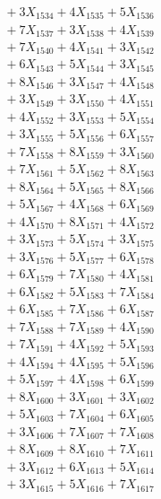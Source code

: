 \documentclass[a4paper,10pt]{article}
\begin{document}
{\begin{align}
&\;  + 3 X_{1534} + 4 X_{1535} + 5 X_{1536} \\[0.3ex]
&\;  + 7 X_{1537} + 3 X_{1538} + 4 X_{1539} \\[0.5ex]\allowbreak
&\;  + 7 X_{1540} + 4 X_{1541} + 3 X_{1542} \\[0.3ex]
&\;  + 6 X_{1543} + 5 X_{1544} + 3 X_{1545} \\[0.3ex]
&\;  + 8 X_{1546} + 3 X_{1547} + 4 X_{1548} \\[0.3ex]
&\;  + 3 X_{1549} + 3 X_{1550} + 4 X_{1551} \\[0.3ex]
&\;  + 4 X_{1552} + 3 X_{1553} + 5 X_{1554} \\[0.3ex]
&\;  + 3 X_{1555} + 5 X_{1556} + 6 X_{1557} \\[0.3ex]
&\;  + 7 X_{1558} + 8 X_{1559} + 3 X_{1560} \\[0.3ex]
&\;  + 7 X_{1561} + 5 X_{1562} + 8 X_{1563} \\[0.3ex]
&\;  + 8 X_{1564} + 5 X_{1565} + 8 X_{1566} \\[0.3ex]
&\;  + 5 X_{1567} + 4 X_{1568} + 6 X_{1569} \\[0.5ex]\allowbreak
&\;  + 4 X_{1570} + 8 X_{1571} + 4 X_{1572} \\[0.3ex]
&\;  + 3 X_{1573} + 5 X_{1574} + 3 X_{1575} \\[0.3ex]
&\;  + 3 X_{1576} + 5 X_{1577} + 6 X_{1578} \\[0.3ex]
&\;  + 6 X_{1579} + 7 X_{1580} + 4 X_{1581} \\[0.3ex]
&\;  + 6 X_{1582} + 5 X_{1583} + 7 X_{1584} \\[0.3ex]
&\;  + 6 X_{1585} + 7 X_{1586} + 6 X_{1587} \\[0.3ex]
&\;  + 7 X_{1588} + 7 X_{1589} + 4 X_{1590} \\[0.3ex]
&\;  + 7 X_{1591} + 4 X_{1592} + 5 X_{1593} \\[0.3ex]
&\;  + 4 X_{1594} + 4 X_{1595} + 5 X_{1596} \\[0.3ex]
&\;  + 5 X_{1597} + 4 X_{1598} + 6 X_{1599} \\[0.5ex]\allowbreak
&\;  + 8 X_{1600} + 3 X_{1601} + 3 X_{1602} \\[0.3ex]
&\;  + 5 X_{1603} + 7 X_{1604} + 6 X_{1605} \\[0.3ex]
&\;  + 3 X_{1606} + 7 X_{1607} + 7 X_{1608} \\[0.3ex]
&\;  + 8 X_{1609} + 8 X_{1610} + 7 X_{1611} \\[0.3ex]
&\;  + 3 X_{1612} + 6 X_{1613} + 5 X_{1614} \\[0.3ex]
&\;  + 3 X_{1615} + 5 X_{1616} + 7 X_{1617} \\[0.3ex]

\end{align}}
\end{document}
